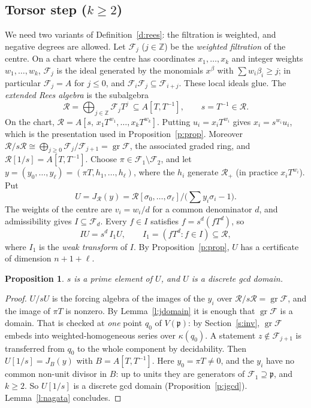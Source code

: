 \documentclass[11pt]{article}
\newcommand{\Z}{\mathbb{Z}}
\newcommand{\p}{\mathfrak{p}}
\newcommand{\cR}{\mathcal{R}}
\newcommand{\cF}{\mathcal{F}}
\newcommand{\gr}{\operatorname{gr}}
\numberwithin{equation}{section}
\theoremstyle{plain}
\newtheorem{proposition}[theorem]{Proposition}
\theoremstyle{definition}
\theoremstyle{remark}
\begin{document}
\subsection{Torsor step ($k\ge2$)}

We need two variants of Definition~\ref{d:rees}: the filtration is weighted, and negative degrees
are allowed. Let $\cF_j$ ($j\in\Z$) be the \emph{weighted filtration} of the centre. On a chart
where the centre has coordinates $x_1,\dots,x_k$ and integer weights $w_1,\dots,w_k$, $\cF_j$ is the
ideal generated by the monomials $x^\beta$ with $\sum w_i\beta_i\ge j$; in particular $\cF_j=A$
for $j\le0$, and $\cF_i\cF_j\subseteq\cF_{i+j}$. These local ideals glue. The \emph{extended Rees
algebra} is the subalgebra
\[
\cR=\bigoplus_{j\in\Z}\cF_jT^j\ \subseteq A[T,T^{-1}],\qquad s=T^{-1}\in\cR .
\]
On the chart, $\cR=A[s,\,x_1T^{w_1},\dots,x_kT^{w_k}]$. Putting $u_i=x_iT^{w_i}$ gives
$x_i=s^{w_i}u_i$, which is the presentation used in Proposition~\ref{p:prop}. Moreover
$\cR/s\cR\cong\bigoplus_{j\ge0}\cF_j/\cF_{j+1}=\gr\cF$, the associated graded ring, and
$\cR[1/s]=A[T,T^{-1}]$. Choose $\pi\in\cF_1\setminus\cF_2$, and let $y=(y_0,\dots,y_\ell)=(\pi T,h_1,\dots,h_\ell)$, where the $h_i$
generate $\cR_+$ (in practice $x_iT^{w_i}$). Put
\[
U=J_{\cR}(y)=\cR[\sigma_0,\dots,\sigma_\ell]\Big/\Big(\sum y_i\sigma_i-1\Big).
\]
The weights of the centre are $v_i=w_i/d$ for a common denominator $d$, and admissibility gives
$I\subseteq\cF_d$. Every $f\in I$ satisfies $f=s^d(fT^d)$, so
\[
IU=s^d\,I_1U,\qquad I_1=(fT^d : f\in I)\subseteq\cR,
\]
where $I_1$ is the \emph{weak transform} of $I$.
By Proposition~\ref{p:prop}, $U$ has a certificate of dimension $n+1+\ell$.

\begin{proposition}\label{p:sprime}
$s$ is a prime element of $U$, and $U$ is a discrete gcd domain.
\end{proposition}

\begin{proof}
$U/sU$ is the forcing algebra of the images of the $y_i$ over $\cR/s\cR=\gr\cF$, and the image of
$\pi T$ is nonzero. By Lemma~\ref{l:jdomain} it is enough that $\gr\cF$ is a domain. That is checked at \emph{one} point $q_0$ of $V(\p)$: by Section~\ref{s:inv},
$\gr\cF$ embeds into weighted-homogeneous series over $\kappa(q_0)$. A statement $z\notin\cF_{j+1}$ is
transferred from $q_0$ to the whole component by decidability. Then $U[1/s]=J_{B}(y)$ with $B=A[T,T^{-1}]$. Here $y_0=\pi T\ne0$, and the $y_i$ have no
common non-unit divisor in $B$: up to units they are generators of $\cF_1\supseteq\p$, and $k\ge2$.
So $U[1/s]$ is a discrete gcd domain (Proposition~\ref{p:jgcd}). Lemma~\ref{l:nagata}
concludes.
\end{proof}
\end{document}
